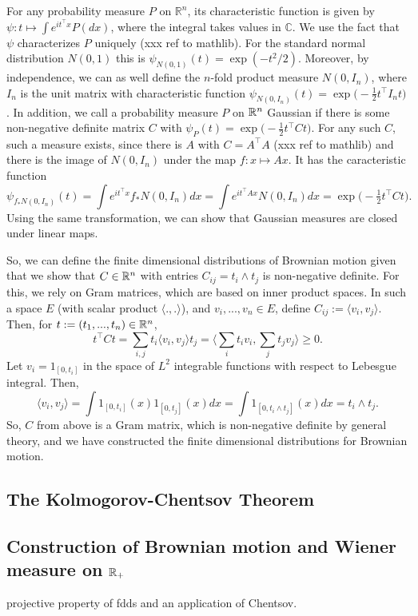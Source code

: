 \documentclass[lean]{DraftAFM}
\begin{document}
For any probability measure $P$ on $\mathbb R^n$, its characteristic function is given by $\psi: t \mapsto \int e^{it^\top x} P(dx)$, where the integral takes values in $\mathbb C$. We use the fact that $\psi$ characterizes $P$ uniquely (xxx ref to mathlib). For the standard normal distribution $N(0,1)$ this is $\psi_{N(0,1)}(t) = \exp(-t^2/2)$. Moreover, by independence, we can as well define the $n$-fold product measure $N(0, I_n)$, where $I_n$ is the unit matrix with characteristic function $\psi_{N(0,I_n)}(t) = \exp\big(-\tfrac 12 t^\top I_n t\big)$. In addition, we call a probability measure $P$ on $\mathbb{R}^n$ Gaussian if there is some non-negative definite matrix $C$ with $\psi_P(t) = \exp\big( - \tfrac 12 t^\top C t\big)$. For any such $C$, such a measure exists, since there is $A$ with $C = A^\top A$ (xxx ref to mathlib) and there is the image of $N(0,I_n)$ under the map $f : x\mapsto Ax$. It has the caracteristic function $$\psi_{f_\ast N(0,I_n)}(t) = \int e^{it^\top x} f_\ast N(0,I_n) dx = \int e^{it^\top A x} N(0,I_n) dx = \exp\big( - \tfrac 12 t^\top C t\big).$$ Using the same transformation, we can show that Gaussian measures are closed under linear maps.

So, we can define the finite dimensional distributions of Brownian motion given that we show that $C \in \mathbb{R}^n$ with entries $C_{ij} = t_i \wedge t_j$ is non-negative definite. For this, we rely on Gram matrices, which are based on inner product spaces. In such a space $E$ (with scalar product $\langle .,. \rangle$), and $v_i,...,v_n \in E$, define $C_{ij} := \langle v_i, v_j\rangle$. Then, for $t :=(t_1,...,t_n) \in \mathbb{R}^n$,
$$ t^\top C t = \sum_{i,j} t_i \langle v_i, v_j\rangle t_j = \Big\langle \sum_i t_i v_i, \sum_j t_j v_j\Big\rangle \geq 0.$$
Let $v_i = 1_{[0,t_i]}$ in the space of $L^2$ integrable functions with respect to Lebesgue integral. Then,
$$ \langle v_i, v_j \rangle = \int 1_{[0,t_i]}(x) 1_{[0,t_j]}(x) dx = \int 1_{[0,t_i \wedge t_j]}(x) dx = t_i \wedge t_j.$$
So, $C$ from above is a Gram matrix, which is non-negative definite by general theory, and we have constructed the finite dimensional distributions for Brownian motion.

\cite{hairer2009introduction}

\subsection{The Kolmogorov-Chentsov Theorem}
\cite{kratschmer2023kolmogorov}
\cite{talagrand2022upper}

\subsection{Construction of Brownian motion and Wiener measure on $\mathbb{R}_+$}
projective property of fdds and an application of Chentsov.
\end{document}
